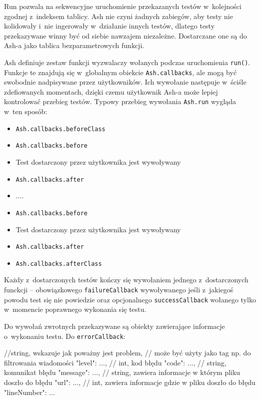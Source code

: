 \documentclass[brudnopis]{xmgr}
\begin{document}
Run pozwala na sekwencyjne uruchomienie przekazanych testów w~kolejności zgodnej z~indeksem tablicy. Ash nie czyni żadnych zabiegów, aby testy nie kolidowały i~nie ingerowały w~działanie innych testów, dlatego testy przekazywane winny być od siebie nawzajem niezależne. Dostarczane one są do Ash-a jako tablica bezparametrowych funkcji.

Ash definiuje zestaw funkcji wyzwalaczy wołanych podczas uruchomienia \texttt{run()}. Funkcje te znajdują się w~globalnym obiekcie \texttt{Ash.callbacks}, ale mogą być swobodnie nadpisywane przez użytkowników. Ich wywołanie następuje w~ściśle zdefiowanych momentach, dzięki czemu użytkownik Ash-a może lepiej kontrolować przebieg testów. Typowy przebieg wywołania \texttt{Ash.run} wygląda w~ten sposób:

\begin{itemize}
  \item \texttt{Ash.callbacks.beforeClass}
  \item \texttt{Ash.callbacks.before}
  \item Test dostarczony przez użytkownika jest wywoływany
  \item \texttt{Ash.callbacks.after}
  \item ....
  \item \texttt{Ash.callbacks.before}
  \item Test dostarczony przez użytkownika jest wywoływany
  \item \texttt{Ash.callbacks.after}
  \item \texttt{Ash.callbacks.afterClass}
\end{itemize}

Każdy z~dostarczonych testów kończy się wywołaniem jednego z~dostarczonych funckcji -- obowiązkowego \texttt{failureCallback} wywoływanego jeśli z~jakiegoś powodu test się nie powiedzie oraz opcjonalnego \texttt{successCallback} wołanego tylko w~momencie poprawnego wykonania się testu.

Do wywołań zwrotnych przekazywane są obiekty zawierające informacje o~wykonaniu testu. Do \texttt{errorCallback}:

\begin{javascriptcode}
	{
    //string, wskazuje jak poważny jest problem, 
    //  może być użyty jako tag np. do filtrowania wiadomości 
		"level":  ...,
    //  int, kod błędu
		"code":   ...,
    // string, komunikat błędu
		"message":   ...,
    // string, zawiera informacje w którym pliku doszło do błędu  
		"url":   ...,
    // int, zawiera informacje gdzie w pliku doszło do błędu
		"lineNumber":  ...
	}
\end{javascriptcode}
\end{document}
